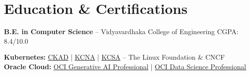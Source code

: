 \documentclass[10pt,a4paper]{article}
\begin{document}
\section*{Education \& Certifications}

\textbf{B.E. in Computer Science} -- Vidyavardhaka College of Engineering \hfill CGPA: 8.4/10.0

\vspace{3pt}
\textbf{Kubernetes:} \href{https://www.credly.com/badges/033591b1-b5d3-4b2a-a64d-c60b5e7b5a5b}{CKAD} \;|\; \href{https://www.credly.com/badges/c3898ac5-72ad-4cd0-97ec-1ea6c3450bc2}{KCNA} \;|\; \href{https://www.credly.com/badges/872f643e-b4db-4d20-b22e-c99f0c3c82e7}{KCSA} -- The Linux Foundation \& CNCF \\
\textbf{Oracle Cloud:} \href{https://catalog-education.oracle.com/ords/certview/sharebadge?id=420F6B9D5AF685E2673024E914D7D242BB289E498DE57B014F4491C3D0EE5906}{OCI Generative AI Professional} \;|\; \href{https://catalog-education.oracle.com/ords/certview/sharebadge?id=82D60C3E567E491254CC2E6AD61BDB6138592F83C296A17B1EF352AD75DFB5D3}{OCI Data Science Professional}
\end{document}
